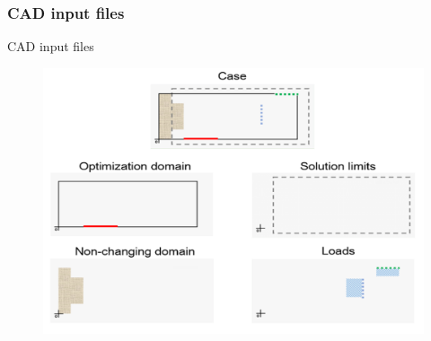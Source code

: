 
\subsubsection{CAD input files}
\begin{frame}{CAD input files}

\begin{figure}
\centering
\includegraphics[width=.7\textwidth]{Pictures/SecondHalf/files_input.png}
\end{figure}
\end{frame}

